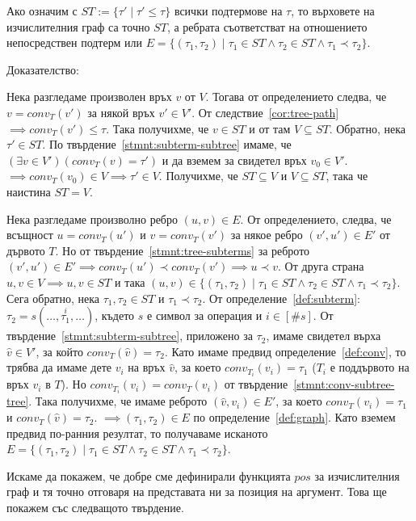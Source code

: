 \documentclass[12pt,twoside,a4paper]{article}
\begin{document}
	\begin{corollary}\label{cor:graph} Ако означим с $ST := \{ \tau' \mid \tau' \leq \tau\}$ всички подтермове на $\tau$, то върховете на изчислителния граф са точно $ST$, а ребрата съответстват на отношението непосредствен подтерм или $E = \{(\tau_1, \tau_2) \mid \tau_1 \in ST \land \tau_2 \in ST \land \tau_1 \prec \tau_2 \}$.
		
		\noindent Доказателство:
		
		\indent Нека разгледаме произволен връх $v$ от $V$. Тогава от определението следва, че $v=conv_T(v')$ за някой връх $v' \in V'$. От следствие~\ref{cor:tree-path} $\implies conv_T(v') \leq \tau$. Така получихме, че $v \in ST$ и от там $V \subseteq ST$. Обратно, нека $\tau' \in ST$. По твърдение~\ref{stmnt:subterm-subtree} имаме, че $(\exists v \in V')(conv_T(v) = \tau')$ и да вземем за свидетел връх $v_0 \in V'$. $\implies conv_T(v_0) \in V \implies \tau' \in V$. Получихме, че $ST \subseteq V$ и $V \subseteq ST$, така че наистина $ST = V$.
		
		Нека разгледаме произволно ребро $(u,v) \in E$. От определението, следва, че всъщност $u=conv_T(u')$ и $v=conv_T(v')$ за някое ребро $(v',u') \in E'$ от дървото $T$. Но от твърдение~\ref{stmnt:tree-subterms} за реброто $(v',u') \in E' \implies conv_T(u') \prec conv_T(v') \implies u \prec v$. От друга страна $u, v \in V \implies u, v \in ST$ и така $(u,v) \in \{(\tau_1, \tau_2) \mid \tau_1 \in ST \land \tau_2 \in ST \land \tau_1 \prec \tau_2 \}$. Сега обратно, нека $\tau_1, \tau_2 \in ST$ и $\tau_1 \prec \tau_2$. От определение~\ref{def:subterm}: $\tau_2 = s(\dots, \overset{i}{\tau_1}, \dots)$, където $s$ е символ за операция и $i \in [\#s]$. От твърдение~\ref{stmnt:subterm-subtree}, приложено за $\tau_2$, имаме свидетел върха $\hat{v} \in V'$, за който $conv_T(\hat{v}) = \tau_2$. Като имаме предвид определение~\ref{def:conv}, то трябва да имаме дете $v_i$ на връх $\hat{v}$, за което $conv_{T_i}(v_i) = \tau_1$ ($T_i$ е поддървото на връх $v_i$ в $T$). Но $conv_{T_i}(v_i) = conv_T(v_i)$ от твърдение~\ref{stmnt:conv-subtree-tree}. Така получихме, че имаме реброто $(\hat{v},v_i) \in E'$, за което $conv_T(v_i) = \tau_1$ и $conv_T(\hat{v}) = \tau_2$. $\implies (\tau_1, \tau_2) \in E$ по определение~\ref{def:graph}. Като вземем предвид по-ранния резултат, то получаваме исканото $E = \{(\tau_1, \tau_2) \mid \tau_1 \in ST \land \tau_2 \in ST \land \tau_1 \prec \tau_2 \}$.
	\end{corollary}
	
	Искаме да покажем, че добре сме дефинирали функцията $pos$ за изчислителния граф и тя точно отговаря на представата ни за позиция на аргумент. Това ще покажем със следващото твърдение.
	
\end{document}
